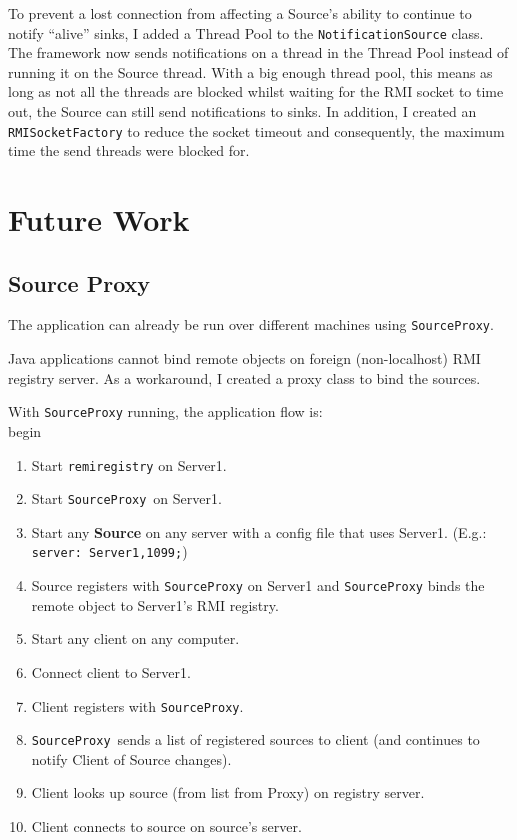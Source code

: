\documentclass[a4paper]{article}
\begin{document}
To prevent a lost connection from affecting a Source's ability to continue to notify ``alive'' sinks, I added a Thread Pool to the \texttt{NotificationSource} class.
The framework now sends notifications on a thread in the Thread Pool instead of running it on the Source thread.
With a big enough thread pool, this means as long as not all the threads are blocked whilst waiting for the RMI socket to time out, the Source can still send notifications to sinks.
In addition, I created an \texttt{RMISocketFactory} to reduce the socket timeout and consequently, the maximum time the send threads were blocked for.

\section{Future Work}
\subsection{Source Proxy}\label{sec:source_proxy}
The application can already be run over different machines using \texttt{SourceProxy}.

Java applications cannot bind remote objects on foreign (non-localhost) RMI registry server.
As a workaround, I created a proxy class to bind the sources.

With \texttt{SourceProxy} running, the application flow is:
\\begin{\begin{enumerate}
  \item Start \texttt{remiregistry} on Server1.
  \item Start \texttt{SourceProxy} on Server1.
  \item Start any \textbf{Source} on any server with a config file that uses Server1. (E.g.: \texttt{server: Server1,1099;})
  \item Source registers with \texttt{SourceProxy} on Server1 and \texttt{SourceProxy} binds the remote object to Server1's RMI registry.
  \item Start any client on any computer.
  \item Connect client to Server1.
  \item Client registers with \texttt{SourceProxy}.
  \item \texttt{SourceProxy} sends a list of registered sources to client (and continues to notify Client of Source changes).
  \item Client looks up source (from list from Proxy) on registry server.
  \item Client connects to source on source's server.
\end{enumerate}}
\end{document}
